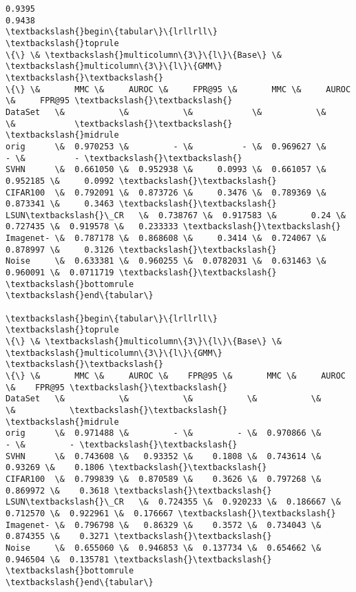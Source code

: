 \documentclass[11pt]{article}
\begin{document}
    \begin{Verbatim}[commandchars=\\\{\}]
0.9395
0.9438
\textbackslash{}begin\{tabular\}\{lrllrll\}
\textbackslash{}toprule
\{\} \& \textbackslash{}multicolumn\{3\}\{l\}\{Base\} \& \textbackslash{}multicolumn\{3\}\{l\}\{GMM\} \textbackslash{}\textbackslash{}
\{\} \&       MMC \&     AUROC \&     FPR@95 \&       MMC \&     AUROC \&     FPR@95 \textbackslash{}\textbackslash{}
DataSet   \&           \&           \&            \&           \&           \&            \textbackslash{}\textbackslash{}
\textbackslash{}midrule
orig      \&  0.970253 \&         - \&          - \&  0.969627 \&         - \&          - \textbackslash{}\textbackslash{}
SVHN      \&  0.661050 \&  0.952938 \&     0.0993 \&  0.661057 \&  0.952185 \&     0.0992 \textbackslash{}\textbackslash{}
CIFAR100  \&  0.792091 \&  0.873726 \&     0.3476 \&  0.789369 \&  0.873341 \&     0.3463 \textbackslash{}\textbackslash{}
LSUN\textbackslash{}\_CR   \&  0.738767 \&  0.917583 \&       0.24 \&  0.727435 \&  0.919578 \&   0.233333 \textbackslash{}\textbackslash{}
Imagenet- \&  0.787178 \&  0.868608 \&     0.3414 \&  0.724067 \&  0.878997 \&     0.3126 \textbackslash{}\textbackslash{}
Noise     \&  0.633381 \&  0.960255 \&  0.0782031 \&  0.631463 \&  0.960091 \&  0.0711719 \textbackslash{}\textbackslash{}
\textbackslash{}bottomrule
\textbackslash{}end\{tabular\}

\textbackslash{}begin\{tabular\}\{lrllrll\}
\textbackslash{}toprule
\{\} \& \textbackslash{}multicolumn\{3\}\{l\}\{Base\} \& \textbackslash{}multicolumn\{3\}\{l\}\{GMM\} \textbackslash{}\textbackslash{}
\{\} \&       MMC \&     AUROC \&    FPR@95 \&       MMC \&     AUROC \&    FPR@95 \textbackslash{}\textbackslash{}
DataSet   \&           \&           \&           \&           \&           \&           \textbackslash{}\textbackslash{}
\textbackslash{}midrule
orig      \&  0.971488 \&         - \&         - \&  0.970866 \&         - \&         - \textbackslash{}\textbackslash{}
SVHN      \&  0.743608 \&   0.93352 \&    0.1808 \&  0.743614 \&   0.93269 \&    0.1806 \textbackslash{}\textbackslash{}
CIFAR100  \&  0.799839 \&  0.870589 \&    0.3626 \&  0.797268 \&  0.869972 \&    0.3618 \textbackslash{}\textbackslash{}
LSUN\textbackslash{}\_CR   \&  0.724355 \&  0.920233 \&  0.186667 \&  0.712570 \&  0.922961 \&  0.176667 \textbackslash{}\textbackslash{}
Imagenet- \&  0.796798 \&   0.86329 \&    0.3572 \&  0.734043 \&  0.874355 \&    0.3271 \textbackslash{}\textbackslash{}
Noise     \&  0.655060 \&  0.946853 \&  0.137734 \&  0.654662 \&  0.946504 \&  0.135781 \textbackslash{}\textbackslash{}
\textbackslash{}bottomrule
\textbackslash{}end\{tabular\}


    \end{Verbatim}
\end{document}
